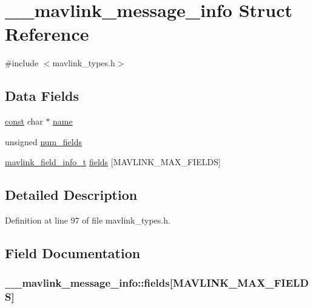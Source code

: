 \hypertarget{struct____mavlink__message__info}{\section{\-\_\-\-\_\-mavlink\-\_\-message\-\_\-info Struct Reference}
\label{struct____mavlink__message__info}
}


{\ttfamily \#include $<$mavlink\-\_\-types.\-h$>$}

\subsection*{Data Fields}
\begin{DoxyCompactItemize}
\item 
\hyperlink{group___n_a_m_e_ga7ae6d0e43244213b34de2c2b9aa30da6}{const} char $\ast$ \hyperlink{struct____mavlink__message__info_a5e8b48c51cb8bc44bd844d1c3049ee32}{name}
\item 
unsigned \hyperlink{struct____mavlink__message__info_a0c343bcc1f27884e8c2ab875e7efc2e5}{num\-\_\-fields}
\item 
\hyperlink{mavlink__types_8h_a00291ed73cb08731cbcccb8dc974ac95}{mavlink\-\_\-field\-\_\-info\-\_\-t} \hyperlink{struct____mavlink__message__info_a4a15f20958b43cb1282575c6da67a37b}{fields} \mbox{[}M\-A\-V\-L\-I\-N\-K\-\_\-\-M\-A\-X\-\_\-\-F\-I\-E\-L\-D\-S\mbox{]}
\end{DoxyCompactItemize}


\subsection{Detailed Description}


Definition at line 97 of file mavlink\-\_\-types.\-h.



\subsection{Field Documentation}
\hypertarget{struct____mavlink__message__info_a4a15f20958b43cb1282575c6da67a37b}{
\subsubsection[{fields}]{ \-\_\-\-\_\-mavlink\-\_\-message\-\_\-info\-::fields\mbox{[}M\-A\-V\-L\-I\-N\-K\-\_\-\-M\-A\-X\-\_\-\-F\-I\-E\-L\-D\-S\mbox{]}}}\label{struct____mavlink__message__info_a4a15f20958b43cb1282575c6da67a37b}


